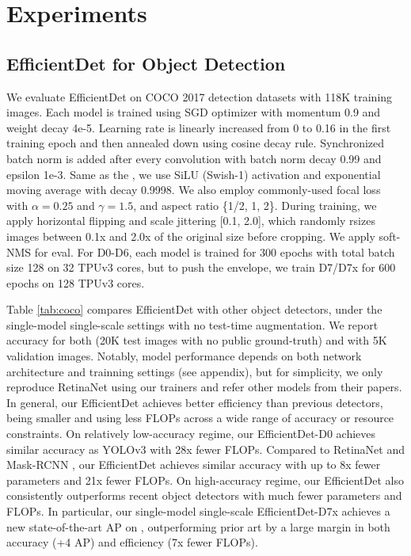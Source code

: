 \documentclass[10pt,twocolumn,letterpaper]{article}
\begin{document}
\section{Experiments}
\label{sec:results}

\subsection{EfficientDet for Object Detection}


We evaluate EfficientDet on COCO 2017 detection datasets \cite{coco14} with 118K training images. Each model is trained using SGD optimizer with momentum 0.9 and weight decay 4e-5. Learning rate is linearly increased from 0 to 0.16 in the first  training epoch and then annealed down using cosine decay rule. Synchronized batch norm is added after every convolution with batch norm decay 0.99 and epsilon 1e-3. Same as the \cite{efficientnet19}, we use SiLU (Swish-1) activation \cite{swishsil18,gelu16,swish18} and exponential moving average with decay 0.9998. We also employ commonly-used focal loss \cite{retinanet17} with $\alpha = 0.25$ and $\gamma = 1.5$, and aspect ratio \{1/2, 1, 2\}.  During training, we apply horizontal flipping and scale jittering [0.1, 2.0], which randomly rsizes images between 0.1x and 2.0x of the original size before cropping. We apply soft-NMS \cite{softnms17} for eval. For D0-D6, each model is  trained for 300 epochs with total batch  size 128 on 32 TPUv3 cores, but to push the envelope, we train D7/D7x for 600 epochs on 128 TPUv3 cores.

Table \ref{tab:coco} compares EfficientDet with other object detectors, under the single-model single-scale settings with no test-time augmentation. We report accuracy for both   (20K test images with no public ground-truth) and  with 5K validation images. Notably, model performance depends on both network architecture and trainning settings (see appendix), but for simplicity, we only reproduce RetinaNet using our trainers and refer other models from their papers.
In general, our EfficientDet achieves better efficiency than previous detectors, being  smaller and using  less FLOPs across a wide range of accuracy or resource constraints.
On relatively low-accuracy regime, our EfficientDet-D0 achieves similar accuracy as YOLOv3 with 28x fewer FLOPs. Compared to RetinaNet \cite{retinanet17} and Mask-RCNN \cite{maskrcnn17}, our EfficientDet achieves similar accuracy with up to 8x fewer parameters and 21x fewer FLOPs. On high-accuracy regime, our EfficientDet also consistently outperforms recent object detectors \cite{nasfpn19,odaa19} with much fewer parameters and FLOPs. In particular, our single-model single-scale EfficientDet-D7x achieves a new state-of-the-art  AP on , outperforming prior art by a large margin in both accuracy (+4 AP) and efficiency (7x fewer FLOPs).
\end{document}
